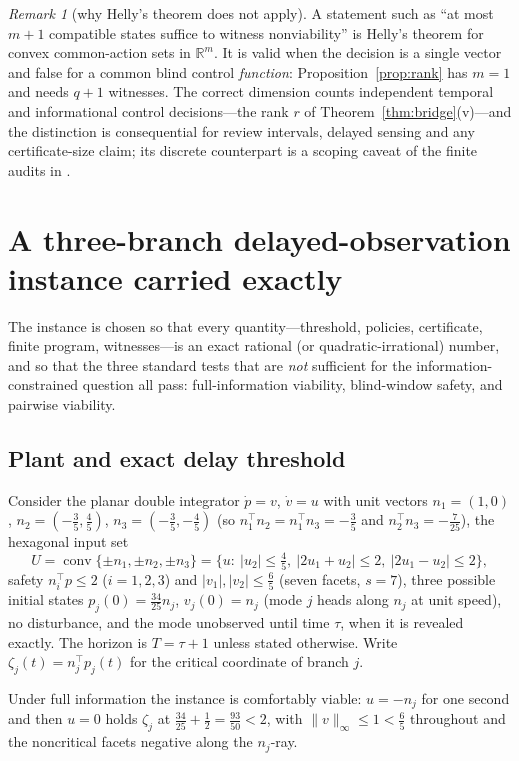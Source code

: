 \documentclass[11pt,a4paper]{article}
\theoremstyle{plain}
\theoremstyle{definition}
\theoremstyle{remark}
\newtheorem{remark}[theorem]{Remark}
\newcommand{\R}{\mathbb{R}}
\newcommand{\tfr}[2]{\tfrac{#1}{#2}}
\DeclareMathOperator{\conv}{conv}
\begin{document}
\begin{remark}[why Helly's theorem does not apply]\label{rem:helly}
A statement such as ``at most $m+1$ compatible states suffice to witness nonviability'' is Helly's theorem \cite{Helly1923} for convex common-action sets in $\R^m$. It is valid when the decision is a single vector and false for a common blind control \emph{function}: Proposition~\ref{prop:rank} has $m=1$ and needs $q+1$ witnesses. The correct dimension counts independent temporal and informational control decisions---the rank $r$ of Theorem~\ref{thm:bridge}(v)---and the distinction is consequential for review intervals, delayed sensing and any certificate-size claim; its discrete counterpart is a scoping caveat of the finite audits in \cite{Abaee2026worked}.
\end{remark}
\section{A three-branch delayed-observation instance carried exactly}\label{sec:instance}

The instance is chosen so that every quantity---threshold, policies, certificate, finite program, witnesses---is an exact rational (or quadratic-irrational) number, and so that the three standard tests that are \emph{not} sufficient for the information-constrained question all pass: full-information viability, blind-window safety, and pairwise viability.

\subsection{Plant and exact delay threshold}

Consider the planar double integrator $\dot p=v$, $\dot v=u$ with unit vectors $n_1=(1,0)$, $n_2=(-\tfr35,\tfr45)$, $n_3=(-\tfr35,-\tfr45)$ (so $n_1^\top n_2=n_1^\top n_3=-\tfr35$ and $n_2^\top n_3=-\tfr7{25}$), the hexagonal input set
\[
U=\conv\{\pm n_1,\pm n_2,\pm n_3\}=\{u:\ |u_2|\le\tfr45,\ |2u_1+u_2|\le2,\ |2u_1-u_2|\le2\},
\]
safety $n_i^\top p\le2$ ($i=1,2,3$) and $|v_1|,|v_2|\le\tfr65$ (seven facets, $s=7$), three possible initial states $p_j(0)=\tfr{34}{25}n_j$, $v_j(0)=n_j$ (mode $j$ heads along $n_j$ at unit speed), no disturbance, and the mode unobserved until time $\tau$, when it is revealed exactly. The horizon is $T=\tau+1$ unless stated otherwise. Write $\zeta_j(t)=n_j^\top p_j(t)$ for the critical coordinate of branch $j$.

Under full information the instance is comfortably viable: $u=-n_j$ for one second and then $u=0$ holds $\zeta_j$ at $\tfr{34}{25}+\tfr12=\tfr{93}{50}<2$, with $\|v\|_\infty\le1<\tfr65$ throughout and the noncritical facets negative along the $n_j$-ray.
\end{document}
